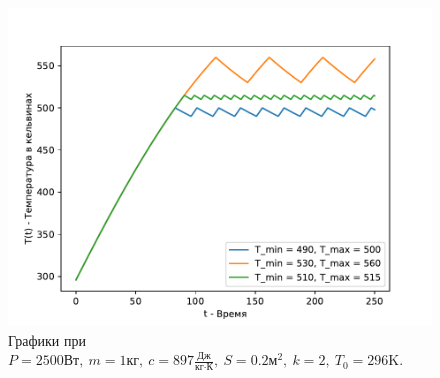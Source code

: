        \begin{figure}[H]
            \centering
            \includegraphics[width=12cm]{pictures/utug4.pdf}
            \caption{Графики при $P = 2500 \text{Вт}, ~ m = 1 \text{кг}, ~ c = 897 \frac{\text{Дж}}{\text{кг} \cdot \text{К}}, ~ S = 0.2 \text{м}^2, ~ k = 2, ~ T_0 = 296 \text{K}$.}
        \end{figure}


